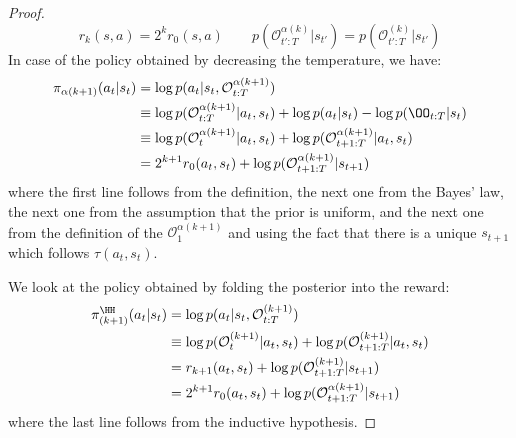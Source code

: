 \begin{proof}
    \[
    r_k(s, a) = 2^kr_0(s, a) \qquad p(\mathcal{O}_{t':T}^{\alpha(k)}|s_{t'}) = p(\mathcal{O}_{t':T}^{(k)}|s_{t'})
    \]
    In case of the policy obtained by decreasing the temperature, we have:
    \begin{align*}
        \pi_{\alpha(k+1)}(a_t|s_t) &= \log p(a_t|s_t, \mathcal{O}_{t:T}^{\alpha(k+1)}) \\
        & \equiv \log p(\mathcal{O}_{t:T}^{\alpha(k+1)}|a_t, s_t) + \log p(a_t|s_t) - \log p(\OO_{t:T}|s_t)\\
        & \equiv \log p(\mathcal{O}_{t}^{\alpha(k+1)}|a_t, s_t) + \log p(\mathcal{O}_{t+1:T}^{\alpha(k+1)}|a_t, s_t) \\
        &= 2^{k + 1}r_0(a_t, s_t) + \log p(\mathcal{O}_{t+1:T}^{\alpha(k+1)}|s_{t+1})
    \end{align*}
    where the first line follows from the definition, the next one from the Bayes' law, the next one from the assumption that the prior is uniform, and the next one from the definition of the $\mathcal{O}_{1}^{\alpha(k+1)}$ and using the fact that there is a unique $s_{t+1}$ which follows $\tau(a_t, s_t)$.
    
    We look at the policy obtained by folding the posterior into the reward:
    \begin{align*}
        \pi_{(k+1)}^\HH(a_t|s_t) &= \log p(a_t|s_t, \mathcal{O}_{t:T}^{(k+1)}) \\
        & \equiv \log p(\mathcal{O}_{t}^{(k+1)}|a_t, s_t) + \log p(\mathcal{O}_{t+1:T}^{(k+1)}|a_t, s_t) \\
        &= r_{k+1}(a_t, s_t) + \log p(\mathcal{O}_{t+1:T}^{(k+1)}|s_{t+1}) \\
        &= 2^{k+1}r_0(a_t, s_t) + \log p(\mathcal{O}_{t+1:T}^{\alpha(k+1)}|s_{t+1})
    \end{align*}
    where the last line follows from the inductive hypothesis.
\end{proof}

